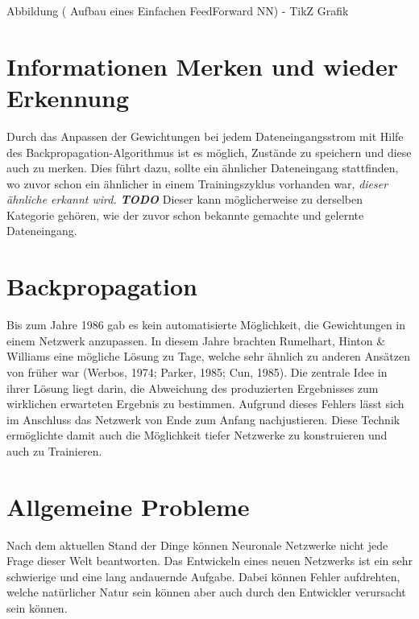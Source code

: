 Abbildung ( Aufbau eines Einfachen FeedForward NN) - TikZ Grafik

\section{Informationen Merken und wieder Erkennung}

Durch das Anpassen der Gewichtungen bei jedem Dateneingangsstrom mit Hilfe des Backpropagation-Algorithmus ist es möglich, Zustände zu speichern und diese auch zu merken. 
Dies führt dazu, sollte ein ähnlicher Dateneingang stattfinden, wo zuvor schon ein ähnlicher in einem Trainingszyklus vorhanden war, \textit{dieser ähnliche erkannt wird. \textbf{TODO}} 
Dieser kann möglicherweise zu derselben Kategorie gehören, wie der zuvor schon bekannte gemachte und gelernte Dateneingang.

\section{Backpropagation}

Bis zum Jahre 1986 gab es kein automatisierte Möglichkeit, die Gewichtungen in einem Netzwerk anzupassen.
In diesem Jahre brachten Rumelhart, Hinton \& Williams eine mögliche Lösung zu Tage, welche sehr ähnlich zu anderen Ansätzen von früher war (Werbos, 1974; Parker, 1985; Cun, 1985).
Die zentrale Idee in ihrer Lösung liegt darin, die Abweichung des produzierten Ergebnisses zum wirklichen erwarteten Ergebnis zu bestimmen. 
Aufgrund dieses Fehlers lässt sich im Anschluss das Netzwerk von Ende zum Anfang nachjustieren. 
Diese Technik ermöglichte damit auch die Möglichkeit tiefer Netzwerke zu konstruieren und auch zu Trainieren.

\section{Allgemeine Probleme}

Nach dem aktuellen Stand der Dinge können Neuronale Netzwerke nicht jede Frage dieser Welt beantworten.
Das Entwickeln eines neuen Netzwerks ist ein sehr schwierige und eine lang andauernde Aufgabe. 
Dabei können Fehler aufdrehten, welche natürlicher Natur sein können aber auch durch den Entwickler verursacht sein können. \\


